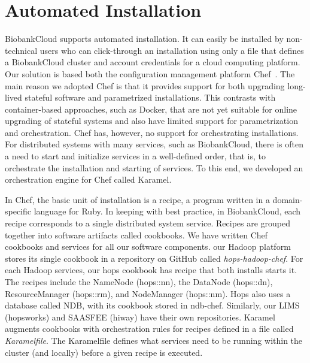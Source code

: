 \section{Automated Installation}

BiobankCloud supports automated installation. It can easily be installed by non-technical users who can click-through an installation using only a file that defines a BiobankCloud cluster and account credentials for a cloud computing platform. Our solution is based both the configuration management platform Chef~\cite{chef13nelson}. The main reason we adopted Chef is that it provides support for both upgrading long-lived stateful software and parametrized installations. This contrasts with container-based approaches, such as Docker, that are not yet suitable for online upgrading of stateful systems and also have limited support for parametrization and orchestration. Chef has, however, no support for orchestrating installations. For distributed systems with many services, such as BiobankCloud, there is often a need to start and initialize services in a well-defined order, that is, to orchestrate the installation and starting of services. To this end, we developed an orchestration engine for Chef called Karamel. 

In Chef, the basic unit of installation is a recipe, a program written in a domain-specific language for Ruby. In keeping with best practice, in BiobankCloud, each recipe corresponds to a single distributed system service. Recipes are grouped together into software artifacts called cookbooks. We have written Chef cookbooks and services for all our software components. our Hadoop platform stores its single cookbook in a repository on GitHub called \textit{hops-hadoop-chef}. For each Hadoop services, our hops cookbook has recipe that both installs starts it. The recipes include the NameNode (hops::nn), the DataNode (hops::dn), ResourceManager (hops::rm), and NodeManager (hops::nm). Hops also uses a database called NDB, with its cookbook stored in ndb-chef. Similarly, our LIMS (hopsworks) and SAASFEE (hiway) have their own repositories. Karamel augments cookbooks with orchestration rules for recipes defined in a file called \textit{Karamelfile}. The Karamelfile defines what services need to be running within the cluster (and locally) before a given recipe is executed. 

